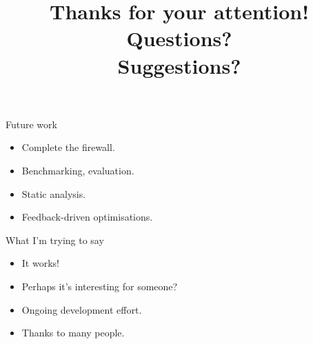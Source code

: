 \documentclass{beamer}
\begin{document}
\begin{frame}{Future work}
	\begin{itemize}
		\item \Large{Complete the firewall.}
		\item Benchmarking, evaluation.
		\item Static analysis.
		\item Feedback-driven optimisations.
	\end{itemize}
\end{frame}

\begin{frame}{What I'm trying to say}
	\begin{itemize}
		\item \Large{It works!}
		\item Perhaps it's interesting for someone?
		\item Ongoing development effort.
		\item Thanks to many people.
	\end{itemize}
\end{frame}

\begin{frame}
	\title{Thanks for your attention! \\ \vspace{30pt} Questions? \\ Suggestions?}
	\date{}
	\author[]{}
	\titlepage
\end{frame}
\end{document}

